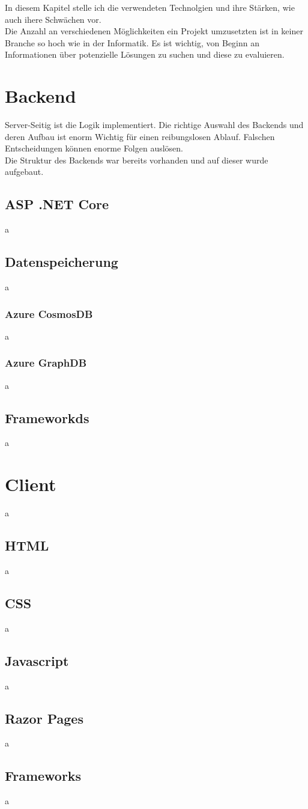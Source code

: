 In diesem Kapitel stelle ich die verwendeten Technolgien und ihre Stärken, 
wie auch ihere Schwächen vor.
\\
Die Anzahl an verschiedenen Möglichkeiten ein Projekt umzusetzten ist in keiner 
Branche so hoch wie in der Informatik. Es ist wichtig, von Beginn an Informationen 
über potenzielle Lösungen zu suchen und diese zu evaluieren.

\section{Backend}
Server-Seitig ist die Logik implementiert. Die richtige Auswahl des Backends und deren Aufbau ist
enorm Wichtig für einen reibungslosen Ablauf. Falschen Entscheidungen können enorme Folgen auslösen.
\\
Die Struktur des Backends war bereits vorhanden und auf dieser wurde aufgebaut.

    \subsection{ASP .NET Core}
    a

    \subsection{Datenspeicherung}
    a

        \subsubsection{Azure CosmosDB}
        a

        \subsubsection{Azure GraphDB}
        a

    \subsection{Frameworkds}
    a

\section{Client}
a

    \subsection{HTML}
    a

    \subsection{CSS}
    a

    \subsection{Javascript}
    a

    \subsection{Razor Pages}
    a

    \subsection{Frameworks}
    a   